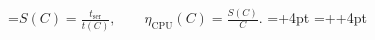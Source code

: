 \documentclass[11pt]{article}
\begin{document}
=\hbox{$\displaystyle S(C)=\frac{t_{\mathrm{ser}}}{t(C)},\qquad \eta_{\mathrm{CPU}}(C)=\frac{S(C)}{C}.$}
\pdfpagewidth=\dimexpr{}+4pt\relax
\pdfpageheight=\dimexpr{}++4pt\relax
\hoffset=-1in
\voffset=-1in
\shipout\vbox{\kern2pt\hbox{\kern2pt\kern2pt}\kern2pt}
\end{document}

